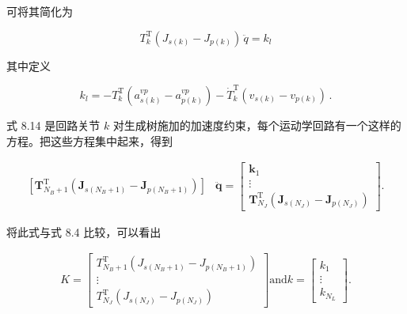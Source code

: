 \documentclass[10pt,a4paper]{book}
\theoremstyle{thmstyle} %
\theoremstyle{defstyle} %
\theoremstyle{prostyle} %
\begin{document}
可将其简化为



$$
T _ { k } ^{\mathrm { T} } ( J _ { s ( k ) } - J _ { p ( k ) } ) \, \ddot { q } = k _ { l }
$$



其中定义



$$
k _ { l } = - T _ { k } ^{\mathrm { T} } ( a _ { s ( k ) } ^{v p} - a _ { p ( k ) } ^{v p} ) - \dot { T } _ { k } ^{\mathrm { T} } ( v _ { s ( k ) } - v _ { p ( k ) } ) \, .
$$



式 8.14 是回路关节 $k$ 对生成树施加的加速度约束，每个运动学回路有一个这样的方程。把这些方程集中起来，得到



$$
\begin{array}{rl} { \left[ \boldsymbol { T } _ { N _ { B } + 1 } ^{\mathrm { T} } \left( \boldsymbol { J } _ { s ( N _ { B } + 1 ) } - \boldsymbol { J } _ { p ( N _ { B } + 1 ) } \right) \right] } & { \ddot { \boldsymbol { q } } = \left[ \begin{array}{l} { \boldsymbol { k } _ { 1 } } \\{ \vdots } \\{ \boldsymbol { T } _ { N _ { J } } ^{\mathrm { T} } \left( \boldsymbol { J } _ { s ( N _ { J } ) } - \boldsymbol { J } _ { p ( N _ { J } ) } \right) } \end{array} \right] . } \end{array}
$$



将此式与式 8.4 比较，可以看出



$$
\begin{array}{r} { K = \left[ \begin{array}{l} { T _ { N _ { B } + 1 } ^{\mathrm { T} } \left( J _ { s ( N _ { B } + 1 ) } - J _ { p ( N _ { B } + 1 ) } \right) } \\{ \vdots } \\{ T _ { N _ { J } } ^{\mathrm { T} } \left( J _ { s ( N _ { J } ) } - J _ { p ( N _ { J } ) } \right) } \end{array} \right]  \mathrm { a n d }  k = \left[ \begin{array}{l} { k _ { 1 } } \\{ \vdots } \\{ k _ { N _ { L } } } \end{array} \right] . } \end{array}
$$
\end{document}
